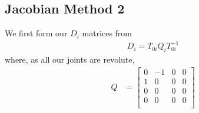 \documentclass[onecolumn,10pt]{jhwhw}
\begin{document}
\subsection{Jacobian Method 2}

We first form our $D_i$ matrices from
\begin{align*}
D_i = T_{0i} Q_i T_{0i}^{-1}
\end{align*}
where, as all our joints are revolute,
\begin{align*}
Q &=
\left[\begin{matrix}
    0 & -1 & 0 & 0 \\
    1 &  0 & 0 & 0 \\
    0 &  0 & 0 & 0 \\
    0 &  0 & 0 & 0 \\
\end{matrix}\right] \\
\end{align*}
\end{document}
